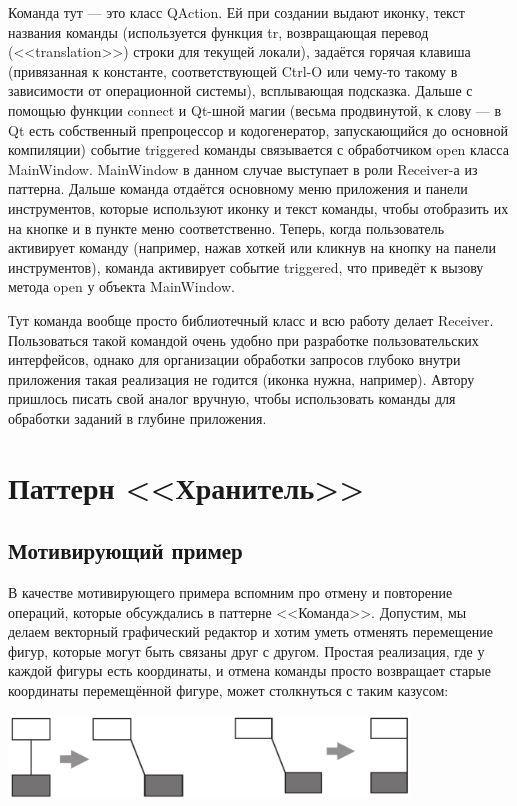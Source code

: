 \documentclass{../../text-style}
\begin{document}
Команда тут --- это класс QAction. Ей при создании выдают иконку, текст названия команды (используется функция tr, возвращающая перевод (<<translation>>) строки для текущей локали), задаётся горячая клавиша (привязанная к константе, соответствующей Ctrl-O или чему-то такому в зависимости от операционной системы), всплывающая подсказка. Дальше с помощью функции connect и Qt-шной магии (весьма продвинутой, к слову --- в Qt есть собственный препроцессор и кодогенератор, запускающийся до основной компиляции) событие triggered команды связывается с обработчиком open класса MainWindow. MainWindow в данном случае выступает в роли Receiver-а из паттерна. Дальше команда отдаётся основному меню приложения и панели инструментов, которые используют иконку и текст команды, чтобы отобразить их на кнопке и в пункте меню соответственно. Теперь, когда пользователь активирует команду (например, нажав хоткей или кликнув на кнопку на панели инструментов), команда активирует событие triggered, что приведёт к вызову метода open у объекта MainWindow. 

Тут команда вообще просто библиотечный класс и всю работу делает Receiver. Пользоваться такой командой очень удобно при разработке пользовательских интерфейсов, однако для организации обработки запросов глубоко внутри приложения такая реализация не годится (иконка нужна, например). Автору пришлось писать свой аналог вручную, чтобы использовать команды для обработки заданий в глубине приложения.

\section{Паттерн <<Хранитель>>}

\subsection{Мотивирующий пример}

В качестве мотивирующего примера вспомним про отмену и повторение операций, которые обсуждались в паттерне <<Команда>>. Допустим, мы делаем векторный графический редактор и хотим уметь отменять перемещение фигур, которые могут быть связаны друг с другом. Простая реализация, где у каждой фигуры есть координаты, и отмена команды просто возвращает старые координаты перемещённой фигуре, может столкнуться с таким казусом:

\begin{center}
    \includegraphics[width=0.8\textwidth]{mementoMotivation.png}
\end{center}
\end{document}
